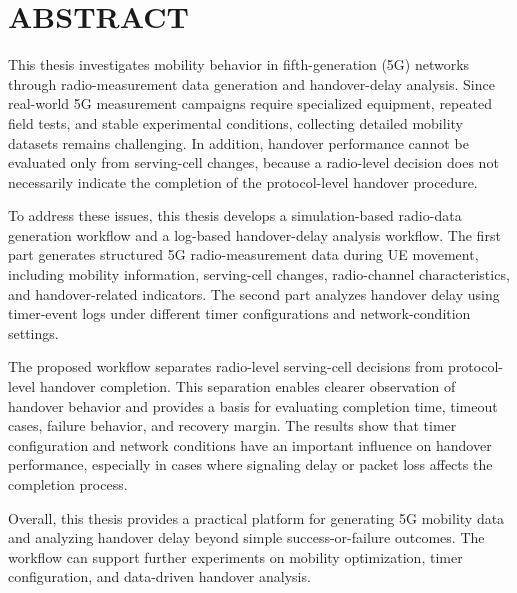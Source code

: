 \section*{ABSTRACT}

This thesis investigates mobility behavior in fifth-generation (5G) networks through radio-measurement data generation and handover-delay analysis. Since real-world 5G measurement campaigns require specialized equipment, repeated field tests, and stable experimental conditions, collecting detailed mobility datasets remains challenging. In addition, handover performance cannot be evaluated only from serving-cell changes, because a radio-level decision does not necessarily indicate the completion of the protocol-level handover procedure.

To address these issues, this thesis develops a simulation-based radio-data generation workflow and a log-based handover-delay analysis workflow. The first part generates structured 5G radio-measurement data during UE movement, including mobility information, serving-cell changes, radio-channel characteristics, and handover-related indicators. The second part analyzes handover delay using timer-event logs under different timer configurations and network-condition settings.

The proposed workflow separates radio-level serving-cell decisions from protocol-level handover completion. This separation enables clearer observation of handover behavior and provides a basis for evaluating completion time, timeout cases, failure behavior, and recovery margin. The results show that timer configuration and network conditions have an important influence on handover performance, especially in cases where signaling delay or packet loss affects the completion process.

Overall, this thesis provides a practical platform for generating 5G mobility data and analyzing handover delay beyond simple success-or-failure outcomes. The workflow can support further experiments on mobility optimization, timer configuration, and data-driven handover analysis.

\cleardoublepage
